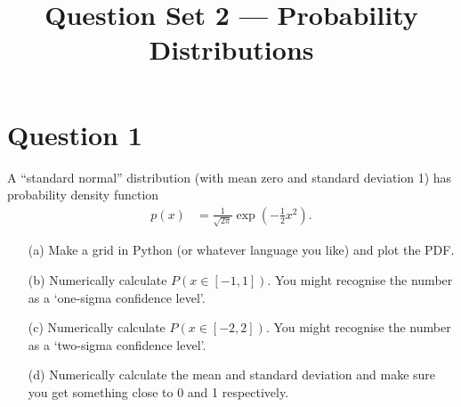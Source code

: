 \documentclass[a4paper, 12pt]{article}
\title{Question Set 2 --- Probability Distributions}
\author{}
\date{}
\begin{document}
\maketitle


\setlength{\parindent}{0pt}
\setlength{\parskip}{8pt}

\section*{Question 1}
A ``standard normal'' distribution (with mean zero and standard deviation 1)
has probability density function
\begin{align}
p(x) &= \frac{1}{\sqrt{2\pi}} \exp\left(-\frac{1}{2}x^2\right).
\end{align}

\begin{enumerate}
\item[(a)] Make a grid in Python (or whatever language you like) and plot
           the PDF.
\item[(b)] Numerically calculate $P(x \in [-1, 1])$. You might recognise the
           number as a `one-sigma confidence level'.
\item[(c)] Numerically calculate $P(x \in [-2, 2])$. You might recognise the
           number as a `two-sigma confidence level'.
\item[(d)] Numerically calculate the mean and standard deviation and make sure
           you get something close to 0 and 1 respectively.
\end{enumerate}
\end{document}
